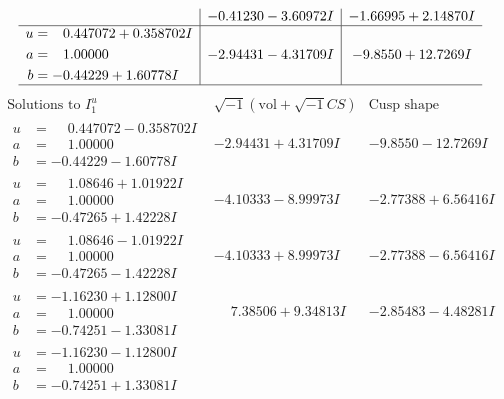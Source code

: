 \documentclass[1p]{elsarticle_modified}
\theoremstyle{definition}
\newcommand{\I}{\sqrt{-1}}
\begin{document}
$$\begin{array}{c|c|c}
 & -0.41230 - 3.60972 I & -1.66995 + 2.14870 I \\ \hline\begin{aligned}
u &= \phantom{-}0.447072 + 0.358702 I \\
a &= \phantom{-}1.00000\phantom{ +0.000000I} \\
b &= -0.44229 + 1.60778 I\end{aligned}
 & -2.94431 - 4.31709 I & -9.8550 + 12.7269 I\\
 \hline 
 \end{array}$$\newpage$$\begin{array}{c|c|c}  
\text{Solutions to }I^u_{1}& \I (\text{vol} + \sqrt{-1}CS) & \text{Cusp shape}\\
 \hline 
\begin{aligned}
u &= \phantom{-}0.447072 - 0.358702 I \\
a &= \phantom{-}1.00000\phantom{ +0.000000I} \\
b &= -0.44229 - 1.60778 I\end{aligned}
 & -2.94431 + 4.31709 I & -9.8550 - 12.7269 I \\ \hline\begin{aligned}
u &= \phantom{-}1.08646 + 1.01922 I \\
a &= \phantom{-}1.00000\phantom{ +0.000000I} \\
b &= -0.47265 + 1.42228 I\end{aligned}
 & -4.10333 - 8.99973 I & -2.77388 + 6.56416 I \\ \hline\begin{aligned}
u &= \phantom{-}1.08646 - 1.01922 I \\
a &= \phantom{-}1.00000\phantom{ +0.000000I} \\
b &= -0.47265 - 1.42228 I\end{aligned}
 & -4.10333 + 8.99973 I & -2.77388 - 6.56416 I \\ \hline\begin{aligned}
u &= -1.16230 + 1.12800 I \\
a &= \phantom{-}1.00000\phantom{ +0.000000I} \\
b &= -0.74251 - 1.33081 I\end{aligned}
 & \phantom{-}7.38506 + 9.34813 I & -2.85483 - 4.48281 I \\ \hline\begin{aligned}
u &= -1.16230 - 1.12800 I \\
a &= \phantom{-}1.00000\phantom{ +0.000000I} \\
b &= -0.74251 + 1.33081 I\end{aligned}

\end{array}$$
\end{document}
